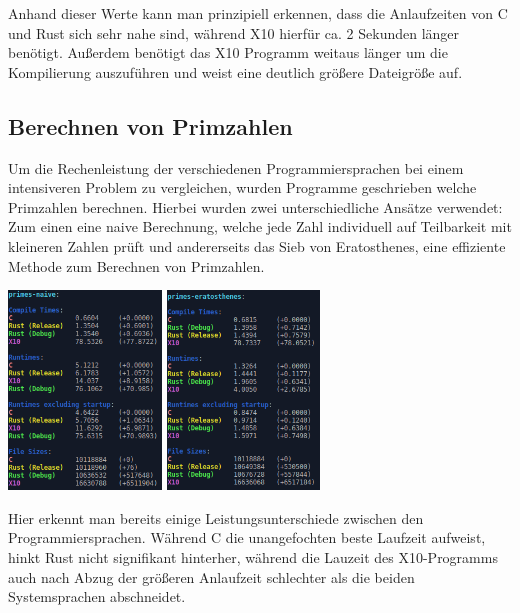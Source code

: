 Anhand dieser Werte kann man prinzipiell erkennen, dass die Anlaufzeiten von C und Rust sich sehr nahe sind, während X10
hierfür ca. 2 Sekunden länger benötigt. Außerdem benötigt das X10 Programm weitaus länger um die Kompilierung auszuführen und
weist eine deutlich größere Dateigröße auf.

\subsection{Berechnen von Primzahlen}

Um die Rechenleistung der verschiedenen Programmiersprachen bei einem intensiveren Problem zu vergleichen, wurden
Programme geschrieben welche Primzahlen berechnen. Hierbei wurden zwei unterschiedliche Ansätze verwendet: Zum einen
eine naive Berechnung, welche jede Zahl individuell auf Teilbarkeit mit kleineren Zahlen prüft und andererseits
das Sieb von Eratosthenes, eine effiziente Methode zum Berechnen von Primzahlen.

\begin{center}
	\includegraphics[height=200px]{eval-screenshots/primes-naive.png}
	\includegraphics[height=200px]{eval-screenshots/primes-eratosthenes.png}
\end{center}

Hier erkennt man bereits einige Leistungsunterschiede zwischen den Programmiersprachen. Während C die unangefochten
beste Laufzeit aufweist, hinkt Rust nicht signifikant hinterher, während die Lauzeit des X10-Programms auch nach Abzug
der größeren Anlaufzeit schlechter als die beiden Systemsprachen abschneidet.


